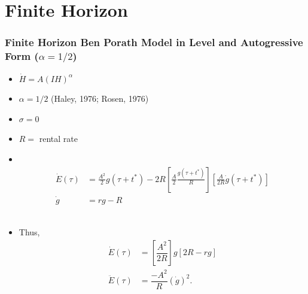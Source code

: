 \documentclass[12pt,compress,handout]{beamer}  %
\begin{document}
\section{Finite Horizon}

\begin{frame}
\frametitle{\normalsize Finite Horizon Ben Porath Model in Level and
Autogressive Form ($\alpha =1/2$)}

\begin{itemize}
\item
$\dot{H} = A \left( IH\right )^\alpha$\\[3mm]

\item
$\alpha =1/2$ (Haley, 1976; Rosen, 1976)\\[3mm]

\item
$\sigma =0$\\[3mm]

\item
$R =$ rental rate
\end{itemize}

\end{frame}


\begin{frame}

\begin{itemize}
\item \ \\[-15mm]
\begin{align*}
\dot{E}(\tau )& =\frac{A^{2}}{2}g(\tau +t^{*})-2R\left[ \frac{A}{2}\frac{g(\tau +t^{*})}{R}\right] \left[ \frac{A}{2R}\dot{g}(\tau +t^{*})\right] \\[3mm]
\dot{g}& =rg-R
\end{align*}\ \\[3mm]
\item Thus,
\begin{align*}
\dot{E}(\tau )& =\left[ \dfrac{A^{2}}{2R}\right] g[2R-rg]\\[3mm]
\ddot{E}(\tau )& =\dfrac{-A^{2}}{R}(\dot{g})^{2}\text{.}
\end{align*}
\end{itemize}
\end{frame}
\end{document}
